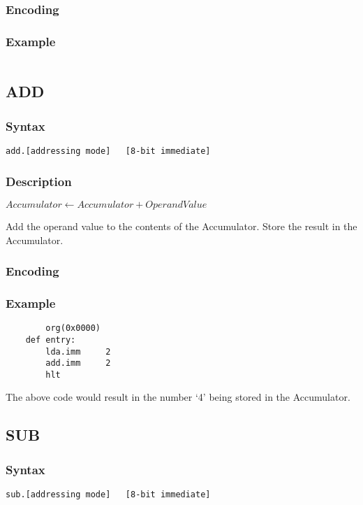     \subsubsection{Encoding}
    \subsubsection{Example}
    \begin{verbatim}
    \end{verbatim}

\pagebreak
\subsection{ADD}\label{subsec:add}
    \subsubsection{Syntax}
    \begin{verbatim}add.[addressing mode]   [8-bit immediate]\end{verbatim}

    \subsubsection{Description}
    $Accumulator \leftarrow Accumulator + OperandValue$
    \par Add the operand value to the contents of the Accumulator.
    Store the result in the Accumulator.

    \subsubsection{Encoding}

    \subsubsection{Example}
    \begin{verbatim}
        org(0x0000)
    def entry:
        lda.imm     2
        add.imm     2
        hlt
    \end{verbatim}
    \par The above code would result in the number `4' being stored in the Accumulator.

\pagebreak
\subsection{SUB}\label{subsec:sub}
    \subsubsection{Syntax}
    \begin{verbatim}sub.[addressing mode]   [8-bit immediate]\end{verbatim}


